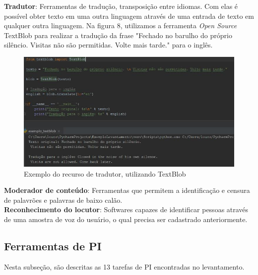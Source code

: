 \documentclass{article}
\begin{document}
\textbf{Tradutor}: Ferramentas de tradução, transposição entre idiomas. Com elas é possível obter texto em uma outra linguagem através de uma entrada de texto em qualquer outra linguagem. Na figura 8, utilizamos a ferramenta \textit{Open Source} TextBlob para realizar a tradução da frase "Fechado no barulho do próprio silêncio. Visitas não são permitidas. Volte mais tarde." \cite{mediumluiz} para o inglês. \\
    \begin{figure}[H]
        \centering
        \includegraphics[scale=0.45]{imagens/tradutor.jpg}
        \caption{Exemplo do recurso de tradutor, utilizando TextBlob}
        \label{fig:tradutor}
    \end{figure}
\textbf{Moderador de conteúdo}: Ferramentas que permitem a identificação e censura de palavrões e palavras de baixo calão. \\
\textbf{Reconhecimento do locutor}: Softwares capazes de identificar pessoas através de uma amostra de voz do usuário, o qual precisa ser cadastrado anteriormente. \\

\subsection{Ferramentas de PI}
Nesta subseção, são descritas as 13 tarefas de PI encontradas no levantamento. \\
\end{document}
